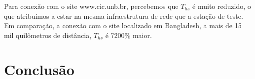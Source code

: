 \documentclass[12pt,a4paper]{report}
\begin{document}
Para conexão com o site www.cic.unb.br, percebemos que \(T_{hs}\) é muito reduzido, o que atribuímos a estar na mesma infraestrutura de rede que a estação de teste. Em comparação, a conexão com o site localizado em Bangladesh, a mais de 15 mil quilômetros de distância, \(T_{hs}\) é 7200\% maior.



\chapter{Conclusão}
\end{document}
